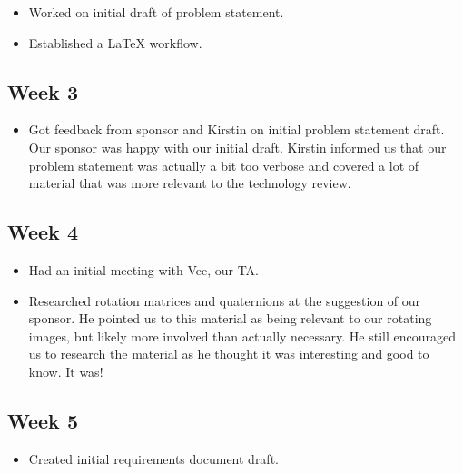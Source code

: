 \documentclass[10pt, onecolumn, draftclsnofoot, letterpaper, compsoc]{IEEEtran}
\begin{document}
    \begin{itemize}

    \item Worked on initial draft of problem statement.

    \item Established a LaTeX workflow.

    \end{itemize}

\subsection{Week 3}

    \begin{itemize}

    \item Got feedback from sponsor and Kirstin on initial problem statement 
    draft. Our sponsor was happy with our initial draft. Kirstin informed us that 
    our problem statement was actually a bit too verbose and covered a lot of 
    material that was more relevant to the technology review.

    \end{itemize}

\subsection{Week 4}

    \begin{itemize}

    \item Had an initial meeting with Vee, our TA.

    \item Researched rotation matrices and quaternions at the suggestion of our 
    sponsor. He pointed us to this material as being relevant to our rotating 
    images, but likely more involved than actually necessary. He still encouraged 
    us to research the material as he thought it was interesting and good to 
    know. It was!

    \end{itemize}

\subsection{Week 5}

    \begin{itemize}

    \item Created initial requirements document draft.

    \end{itemize}
\end{document}
